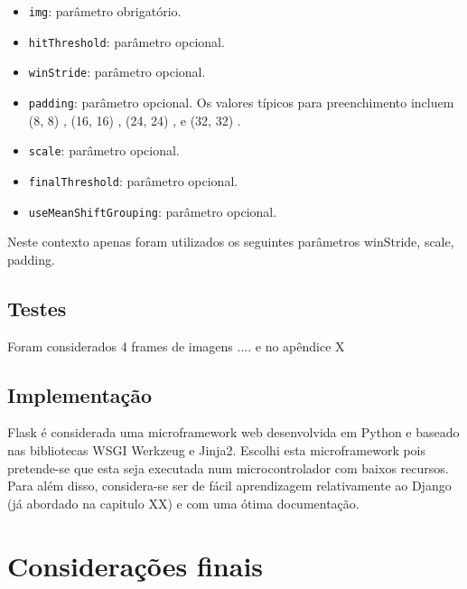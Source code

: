 \begin{itemize}
	\item \texttt{img}: parâmetro obrigatório. 
	\item \texttt{hitThreshold}: parâmetro opcional. 
	\item \texttt{winStride}: parâmetro opcional. 
	\item \texttt{padding}: parâmetro opcional.  Os valores típicos para preenchimento incluem  (8, 8) ,  (16, 16) ,  (24, 24) , e  (32, 32) .
	
	
	\item \texttt{scale}: parâmetro opcional. 
	\item \texttt{finalThreshold}: parâmetro opcional. 
	\item \texttt{useMeanShiftGrouping}: parâmetro opcional. 
\end{itemize}





Neste contexto apenas foram utilizados os seguintes parâmetros winStride, scale, padding. 



\subsection{Testes}

Foram considerados 4 frames de imagens .... e no apêndice X




\subsection{Implementação}



Flask é considerada uma microframework web desenvolvida em Python e baseado nas bibliotecas WSGI Werkzeug e Jinja2. Escolhi esta microframework pois pretende-se que esta seja executada num microcontrolador com baixos recursos. Para além disso, considera-se ser de fácil aprendizagem relativamente ao Django (já abordado na capitulo XX) e com uma ótima documentação. 





\section{Considerações finais}





